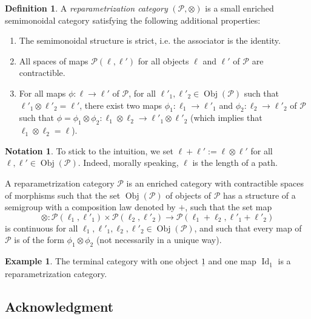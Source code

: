 \documentclass[a4paper,12pt]{amsart}
\newcommand{\p}{\times}
\theoremstyle{definition}
\newtheorem{defn}[thm]{Definition}
\newtheorem{exa}[thm]{Example}
\newcommand{\bd}{\begin{defn}}
\newcommand{\ed}{\end{defn}}
\newtheorem{nota}[thm]{Notation}
\newcommand{\ot}{\otimes}
\DeclareMathOperator{\id}{Id}
\DeclareMathOperator{\Obj}{Obj}
\begin{document}
\bd \label{def-reparam} \cite[Definition~4.3]{Moore1}
A \textit{reparametrization category} $(\mathcal{P},\ot)$ is a small enriched semimonoidal category satisfying the following additional properties: 
\begin{enumerate}
	\item The semimonoidal structure is strict, i.e. the associator is the identity.
	\item All spaces of maps $\mathcal{P}(\ell,\ell')$ for all objects $\ell$ and $\ell'$ of $\mathcal{P}$ are contractible. 
	\item For all maps $\phi:\ell\to \ell'$ of $\mathcal{P}$, for all $\ell'_1,\ell'_2\in \Obj(\mathcal{P})$ such that $\ell'_1\ot\ell'_2=\ell'$, there exist two maps $\phi_1:\ell_1\to \ell'_1$ and $\phi_2:\ell_2\to \ell'_2$ of $\mathcal{P}$ such that $\phi=\phi_1 \ot \phi_2 : \ell_1\ot\ell_2 \to \ell'_1 \ot\ell'_2$ (which implies that $\ell_1 \ot \ell_2=\ell$). 
\end{enumerate}
\ed 

\begin{nota}
	To stick to the intuition, we set $\ell+\ell' := \ell \ot \ell'$ for all $\ell,\ell'\in \Obj(\mathcal{P})$. Indeed, morally speaking, $\ell$ is the length of a path.
\end{nota}

A reparametrization category $\mathcal{P}$ is an enriched category with contractible spaces of morphisms such that  the set $\Obj(\mathcal{P})$ of objects of $\mathcal{P}$ has a structure of a semigroup with a composition law denoted by $+$, such that the set map 
\[
\ot : \mathcal{P}(\ell_1,\ell'_1) \p \mathcal{P}(\ell_2,\ell'_2) \to \mathcal{P}(\ell_1+\ell_2,\ell'_1+\ell'_2)
\]
is continuous for all $\ell_1,\ell'_1,\ell_2,\ell'_2 \in \Obj(\mathcal{P})$, and such that every map of $\mathcal{P}$ is of the form $\phi_1 \ot \phi_2$ (not necessarily in a unique way).


\begin{exa} \label{terminal-reparam}
	The terminal category with one object $\underline{1}$ and one map $\id_{\underline{1}}$ is a reparametri\-zation category. 
\end{exa}


\subsection*{Acknowledgment}
\end{document}

